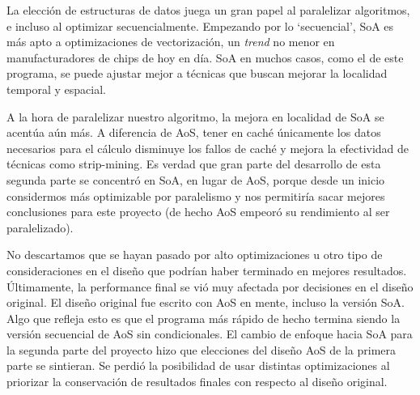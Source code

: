 \documentclass{article}
\begin{document}
La elección de estructuras de datos juega un gran papel al paralelizar algoritmos, e incluso al optimizar secuencialmente.
Empezando por lo `secuencial', SoA es más apto a optimizaciones de vectorización, un \textit{trend} no menor en manufacturadores
de chips de hoy en día. SoA en muchos casos, como el de este programa, se puede ajustar mejor a técnicas que buscan mejorar
la localidad temporal y espacial.

A la hora de paralelizar nuestro algoritmo, la mejora en localidad de SoA se acentúa aún más. A diferencia de AoS, tener en caché únicamente
los datos necesarios para el cálculo disminuye los fallos de caché y mejora la efectividad de técnicas como strip-mining.
Es verdad que gran parte del desarrollo de esta segunda parte
se concentró en SoA, en lugar de AoS, porque desde un inicio considermos más optimizable por paralelismo y nos permitiría sacar mejores conclusiones
para este proyecto (de hecho AoS empeoró su rendimiento al ser paralelizado).

No descartamos que se hayan pasado por alto optimizaciones u otro tipo de consideraciones
en el diseño que podrían haber terminado en mejores resultados. Últimamente, la performance final se vió muy
afectada por decisiones en el diseño original. El diseño original fue escrito con AoS en mente, incluso la versión SoA.
Algo que refleja esto es que el programa más rápido de hecho termina siendo la versión secuencial de AoS sin condicionales.
El cambio de enfoque hacia SoA para la segunda parte del proyecto hizo que elecciones del diseño AoS de la primera
parte se sintieran. Se perdió la posibilidad de usar distintas optimizaciones
al priorizar la conservación de resultados finales con respecto al diseño original.

\printbibliography
\end{document}
